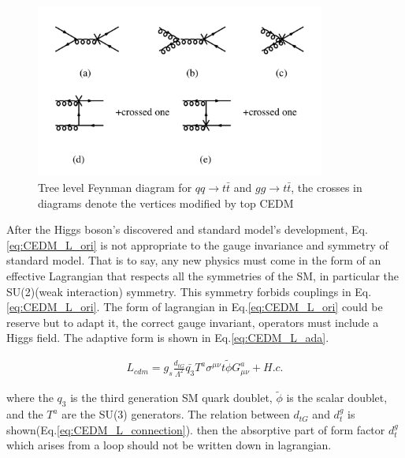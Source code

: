 	\begin{figure}[H]
	\centering
		\includegraphics[width=0.85\textwidth]{Figures/Intro/qqgg_tt.png}
	\caption{Tree level Feynman diagram for $qq \rightarrow t\bar{t}$ and $gg \rightarrow t\bar{t}$, the crosses in diagrams denote the vertices modified by top CEDM \cite{Zhou:1998wz}}
	\label{Intro:fig:qqgg_tt}
	\end{figure}
	\FloatBarrier

	After the Higgs boson's discovered and standard model's development, Eq.\ref{eq:CEDM_L_ori} is not appropriate to the gauge invariance and symmetry of standard model. That is to say, any new physics must come in the form of an effective Lagrangian that respects all the symmetries of the SM, in particular the SU(2)(weak interaction) symmetry. This symmetry forbids couplings in Eq.\ref{eq:CEDM_L_ori}. The form of lagrangian in Eq.\ref{eq:CEDM_L_ori} could be reserve but to adapt it, the correct gauge invariant, operators must include a Higgs field. The adaptive form is shown in Eq.\ref{eq:CEDM_L_ada}.

	\begin{equation}
	\begin{split}
	L_{cdm} = g_s \frac{d_{tG}}{\Lambda^2} \bar{q_3} T^a\sigma^{\mu \nu} t \widetilde{\phi} G^a_{\mu \nu} + H.c.
	\label{eq:CEDM_L_ada}
	\end{split}
	\end{equation}
	\FloatBarrier

	where the $q_3$ is the third generation SM quark doublet, $\widetilde{\phi}$ is the scalar doublet, and the $T^a$ are the SU(3) generators. The relation between $d_{tG}$ and $d_t^g$ is shown(Eq.\ref{eq:CEDM_L_connection}). then the absorptive part of form factor $d_t^g$ which arises from a loop should not be written down in lagrangian.

